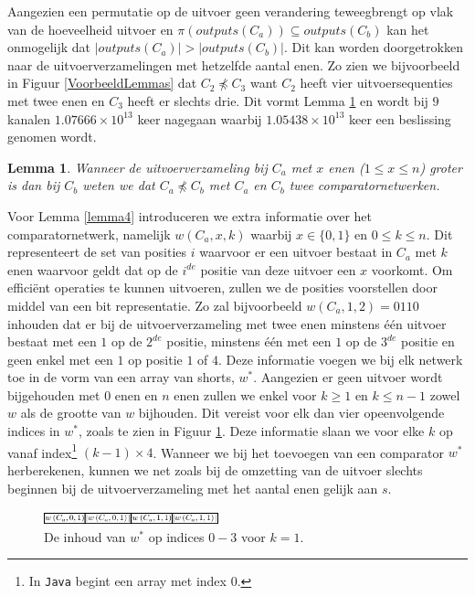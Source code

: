 \documentclass{article}
\newtheorem{lemma}{Lemma}
\begin{document}
Aangezien een permutatie op de uitvoer geen verandering teweegbrengt op vlak van de hoeveelheid uitvoer en ${\pi(outputs(C_a)) \subseteq outputs(C_b)}$ kan het onmogelijk dat ${|outputs(C_a)| > |outputs(C_b)|}$.
Dit kan worden doorgetrokken naar de uitvoerverzamelingen met hetzelfde aantal enen.
Zo zien we bijvoorbeeld in Figuur \ref{VoorbeeldLemmas} dat $C_2 \npreceq C_3$ want $C_2$ heeft vier uitvoersequenties met twee enen en $C_3$ heeft er slechts drie.
Dit vormt Lemma \ref{lemma3} en wordt bij $9$ kanalen $1.07666 \times 10^{13}$ keer nagegaan waarbij $1.05438 \times 10^{13}$ keer een beslissing genomen wordt.
\begin{lemma}
	Wanneer de uitvoerverzameling bij $C_a$ met $x$ enen ($1 \leq x \leq n$) groter is dan bij $C_b$ weten we dat $C_a \npreceq C_b$ met $C_a$ en $C_b$ twee comparatornetwerken.
\label{lemma3}
\end{lemma}
Voor Lemma \ref{lemma4} introduceren we extra informatie over het comparatornetwerk, namelijk $w\left(C_a, x, k\right)$ waarbij ${x \in \{0,1\}}$ en $0\leq k \leq n$.
Dit representeert de set van posities $i$ waarvoor er een uitvoer bestaat in $C_a$ met $k$ enen waarvoor geldt dat op de $i^{de}$ positie van deze uitvoer een $x$ voorkomt.
Om effici\"ent operaties te kunnen uitvoeren, zullen we de posities voorstellen door middel van een bit representatie.
Zo zal bijvoorbeeld $w\left(C_a, 1, 2\right) = 0110$ inhouden dat er bij de uitvoerverzameling met twee enen minstens \'e\'en uitvoer bestaat met een $1$ op de $2^{de}$ positie, minstens \'e\'en met een $1$ op de $3^{de}$ positie en geen enkel met een $1$ op positie $1$ of $4$.
Deze informatie voegen we bij elk netwerk toe in de vorm van een array van shorts, $w^*$.
Aangezien er geen uitvoer wordt bijgehouden met $0$ enen en $n$ enen zullen we enkel voor $k \geq 1 $ en $k \leq n-1$ zowel $w$ als de grootte van $w$ bijhouden.
Dit vereist voor elk dan vier opeenvolgende indices in $w^*$, zoals te zien in Figuur \ref{tabel3}.
Deze informatie slaan we voor elke $k$ op vanaf index\footnote{In \texttt{Java} begint een array met index $0$.} $(k-1) \times 4$.
Wanneer we bij het toevoegen van een comparator $w^*$ herberekenen, kunnen we net zoals bij de omzetting van de uitvoer slechts beginnen bij de uitvoerverzameling met het aantal enen gelijk aan $s$.
\begin{figure}[!h]
	\centering
	\includegraphics[width = 0.45\textwidth]{Tabel3_OpbouwW.png}
	\caption{De inhoud van $w^*$ op indices $0-3$ voor $k = 1$.}
	\label{tabel3} 
\end{figure}
\end{document}
